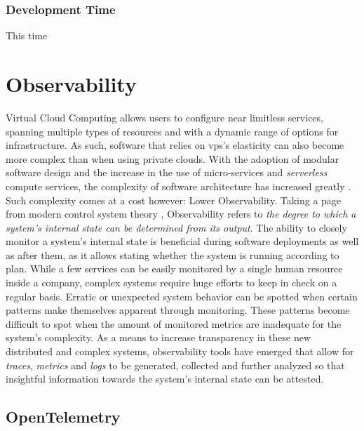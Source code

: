 \subsubsection{Development Time}
This time

\section{Observability}\label{state-of-the-art:s:observability}

Virtual Cloud Computing allows users to configure near limitless services, spanning multiple types of resources and with a dynamic range of options for infrastructure. As such, software that relies on \gls{vps}'s elasticity can also become more complex than when using private clouds. With the adoption of modular software design and the increase in the use of micro-services and \textit{serverless} compute services, the complexity of software architecture has increased greatly \Parencite{niedermaier_koetter_freymann_wagner_2019}.
Such complexity comes at a cost however: Lower Observability. Taking a page from modern control system theory \Parencite{gopal1993modern}, Observability refers to \textit{the degree to which a system's internal state can be determined from its output}. 
The ability to closely monitor a system's internal state is beneficial during software deployments as well as after them, as it allows stating whether the system is running according to plan.
While a few services can be easily monitored by a single human resource inside a company, complex systems require huge efforts to keep in check on a regular basis. 
Erratic or unexpected system behavior can be spotted when certain patterns make themselves apparent through monitoring. These patterns become difficult to spot when the amount of monitored metrics are inadequate for the system's complexity.
As a means to increase transparency in these new distributed and complex systems, observability tools have emerged that allow for \textit{traces}, \textit{metrics} and \textit{logs} to be generated, collected and further analyzed so that insightful information towards the system's internal state can be attested.

\subsection{OpenTelemetry}\label{state-of-the-art:ss:opentelemetry}

